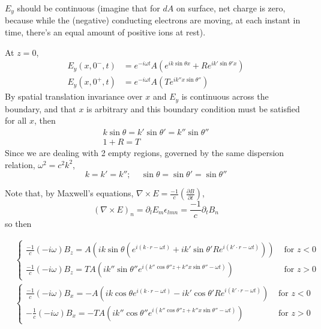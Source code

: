 \documentclass[twoside,10pt]{amsart}
\begin{document}
$E_y$ should be continuous (imagine that for $dA$ on surface, net charge is zero, because while the (negative) conducting electrons are moving, at each instant in time, there's an equal amount of positive ions at rest).  

At $z=0$,
\[
\begin{aligned}
  E_y(x,0^-,t) & = e^{-i\omega t} A (e^{i k \sin{\theta} x } + R e^{i k' \sin{\theta'} x} ) \\ 
  E_y(x,0^+,t) & = e^{-i \omega t} A ( T e^{i k'' x \sin{\theta'' } } ) 
\end{aligned}
\]
By spatial translation invariance over $x$ and $E_y$ is continuous across the boundary, and that $x$ is arbitrary and this boundary condition must be satisfied for all $x$, then
\[
\begin{gathered}
  k\sin{\theta} = k' \sin{\theta'} = k'' \sin{\theta''} \\ 
  1 + R = T
\end{gathered}
\]
Since we are dealing with 2 empty regions, governed by the same dispersion relation, $\omega^2 = c^2 k^2$, 
\[
k = k' = k''; \quad \, \sin{\theta} = \sin{\theta'} = \sin{\theta''}
\]

Note that, by Maxwell's equations, $\nabla \times E = \frac{-1}{c} \left( \frac{ \partial B}{\partial t} \right)$, 
\[
(\nabla \times E)_n = \partial_l E_m \epsilon_{lmn} = \frac{-1}{c} \partial_t B_n
\]
so then

\[
\begin{aligned}
  & \begin{cases} \frac{-1}{c} (-i \omega ) B_z  = A \left( i k \sin{\theta} (e^{ i (k\cdot r - \omega t) } + ik' \sin{\theta' } R e^{ i (k'\cdot r - \omega t) } ) \right) & \text{ for } z < 0 \\ 
      \frac{-1}{c} (-i\omega ) B_z  = TA ( i k'' \sin{\theta''} e^{i ( k''\cos{\theta''} z + k'' x \sin{\theta'' } - \omega t) } ) & \text{ for } z > 0 \end{cases} \\ 
  & \begin{cases} \frac{-1}{c} ( - i \omega ) B_x  = -A \left( i k \cos{\theta} e^{i (k\cdot r - \omega t)} - i k' \cos{\theta'} R e^{i (k'\cdot r - \omega t) } \right) & \text{ for } z < 0 \\ 
      -\frac{1}{c} (-i \omega) B_x  = -TA \left( ik'' \cos{\theta''} e^{ i (k'' \cos{\theta''} z + k'' x \sin{\theta''} - \omega t) } \right)& \text{ for } z > 0 \end{cases} 
\end{aligned}
\]
\end{document}
